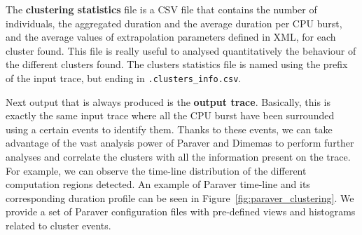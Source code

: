 \documentclass[twoside,a4,english,11pt]{book}
\begin{document}
The \textbf{clustering statistics} file is a CSV file that contains the number
of individuals, the aggregated duration and the average duration per CPU 
burst, and the average values of extrapolation parameters defined in XML,
for each cluster found. This file is really useful to analysed quantitatively
the behaviour of the different clusters found. The clusters statistics file 
is named using the prefix of the input trace, but ending in 
\texttt{.clusters\_info.csv}.


Next output that is always produced is the \textbf{output trace}. Basically,
this is exactly the same input trace where all the CPU burst have been
surrounded using a certain events to identify them. Thanks to these events, we
can take advantage of the vast analysis power of Paraver and Dimemas to 
perform further analyses and correlate the clusters with all the information
present on the trace. For example, we can observe the time-line distribution 
of the different computation regions detected. An example of Paraver 
time-line and its corresponding duration profile can be seen in 
Figure~\ref{fig:paraver_clustering}. We provide a set of Paraver configuration
files with pre-defined views and histograms related to cluster events.
\end{document}
